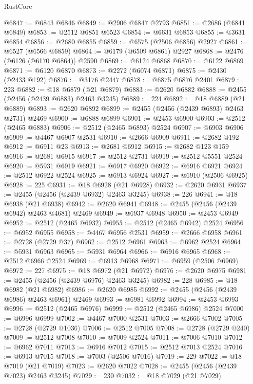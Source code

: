 \begin{lexlean}{RustCore}
\begin{coremodule}
@6847 := @6843 @6846
@6849 := @2906 @6847 @2793
@6851 := @2686 (@6841 @6849)
@6853 := @2512 @6851 @6523
@6854 := @6631 @6853
@6855 := @3631 @6854
@6856 := @2680 @6855
@6859 := @6575 (@2506 @6856) @2927
@6861 := @6527 (@6566 @6859)
@6864 := @6179 (@6509 @6861) @2927
@6868 := @2476 (@6126 (@6170 @6864)) @2590
@6869 := @6124 @6868
@6870 := @6122 @6869
@6871 := @6120 @6870
@6873 := @2272 (@6074 @6871)
@6875 := @2430 (@2433 @192)
@6876 := @3176 @2447
@6878 := @6875 @6876 @2401
@6879 := 223
@6882 := @18 @6879 (@21 @6879)
@6883 := @2620 @6882
@6888 := @2455 (@2456 (@2439 @6883) @2463 @3245)
@6889 := 224
@6892 := @18 @6889 (@21 @6889)
@6893 := @2620 @6892
@6899 := @2455 (@2456 (@2439 @6893) @2463 @2731) @2469
@6900 := @6888 @6899
@6901 := @2453 @6900
@6903 := @2512 (@2465 @6883)
@6906 := @2512 (@2465 @6893) @2524
@6907 := @6903 @6906
@6909 := @4467 @6907 @2531
@6910 := @2666 @6909
@6911 := @2682 @192
@6912 := @6911 @23
@6913 := @2681 @6912
@6915 := @2682 @123 @159
@6916 := @2681 @6915
@6917 := @2512 @2731
@6919 := @2512 @5551 @2524
@6920 := @5931 @6919
@6921 := @6917 @6920
@6922 := @6916 @6921
@6924 := @2512 @6922 @2524
@6925 := @6913 @6924
@6927 := @6910 (@2506 @6925)
@6928 := 225
@6931 := @18 @6928 (@21 @6928)
@6932 := @2620 @6931
@6937 := @2455 (@2456 (@2439 @6932) @2463 @3245)
@6938 := 226
@6941 := @18 @6938 (@21 @6938)
@6942 := @2620 @6941
@6948 := @2455 (@2456 (@2439 @6942) @2463 @4681) @2469
@6949 := @6937 @6948
@6950 := @2453 @6949
@6952 := @2512 (@2465 @6932)
@6955 := @2512 (@2465 @6942) @2524
@6956 := @6952 @6955
@6958 := @4467 @6956 @2531
@6959 := @2666 @6958
@6961 := @2728 (@2729 @37)
@6962 := @2512 @6961
@6963 := @6962 @2524
@6964 := @5931 @6963
@6965 := @5931 @6964
@6966 := @6916 @6965
@6968 := @2512 @6966 @2524
@6969 := @6913 @6968
@6971 := @6959 (@2506 @6969)
@6972 := 227
@6975 := @18 @6972 (@21 @6972)
@6976 := @2620 @6975
@6981 := @2455 (@2456 (@2439 @6976) @2463 @3245)
@6982 := 228
@6985 := @18 @6982 (@21 @6982)
@6986 := @2620 @6985
@6992 := @2455 (@2456 (@2439 @6986) @2463 @6961) @2469
@6993 := @6981 @6992
@6994 := @2453 @6993
@6996 := @2512 (@2465 @6976)
@6999 := @2512 (@2465 @6986) @2524
@7000 := @6996 @6999
@7002 := @4467 @7000 @2531
@7003 := @2666 @7002
@7005 := @2728 (@2729 @1036)
@7006 := @2512 @7005
@7008 := @2728 (@2729 @240)
@7009 := @2512 @7008
@7010 := @7009 @2524
@7011 := @7006 @7010
@7012 := @6962 @7011
@7013 := @6916 @7012
@7015 := @2512 @7013 @2524
@7016 := @6913 @7015
@7018 := @7003 (@2506 @7016)
@7019 := 229
@7022 := @18 @7019 (@21 @7019)
@7023 := @2620 @7022
@7028 := @2455 (@2456 (@2439 @7023) @2463 @3245)
@7029 := 230
@7032 := @18 @7029 (@21 @7029)

\end{coremodule}
\end{lexlean}
